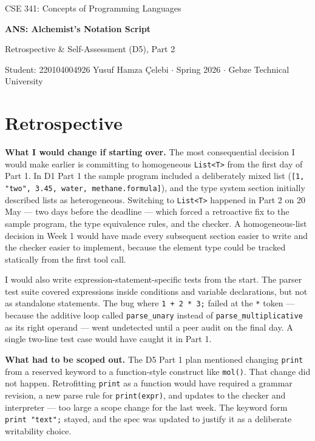 \documentclass[11pt,a4paper]{article}
\newcommand{\code}[1]{\texttt{#1}}
\begin{document}
\begin{center}
  {\footnotesize\color{anscaption}CSE 341: Concepts of Programming Languages\par}
  \vspace{3pt}
  {\huge\bfseries\sffamily ANS: Alchemist's Notation Script\par}
  \vspace{4pt}
  {\large Retrospective \& Self-Assessment (D5), Part 2\par}
  \vspace{6pt}
  {\footnotesize\color{anscaption}
    Student: 220104004926 Yusuf Hamza \c{C}elebi \(\cdot\)
    Spring 2026 \(\cdot\)
    Gebze Technical University\par}
\end{center}
\vspace{7pt}

\section{Retrospective}

\textbf{What I would change if starting over.}\;
The most consequential decision I would make earlier is committing to homogeneous \code{List<T>} from the first day of Part 1. In D1 Part 1 the sample program included a deliberately mixed list (\code{[1, "two", 3.45, water, methane.formula]}), and the type system section initially described lists as heterogeneous. Switching to \code{List<T>} happened in Part 2 on 20 May --- two days before the deadline --- which forced a retroactive fix to the sample program, the type equivalence rules, and the checker. A homogeneous-list decision in Week 1 would have made every subsequent section easier to write and the checker easier to implement, because the element type could be tracked statically from the first tool call.

I would also write expression-statement-specific tests from the start. The parser test suite covered expressions inside conditions and variable declarations, but not as standalone statements. The bug where \code{1 + 2 * 3;} failed at the \code{*} token --- because the additive loop called \code{parse\_unary} instead of \code{parse\_multiplicative} as its right operand --- went undetected until a peer audit on the final day. A single two-line test case would have caught it in Part 1.

\textbf{What had to be scoped out.}\;
The D5 Part 1 plan mentioned changing \code{print} from a reserved keyword to a function-style construct like \code{mol()}. That change did not happen. Retrofitting \code{print} as a function would have required a grammar revision, a new parse rule for \code{print(expr)}, and updates to the checker and interpreter --- too large a scope change for the last week. The keyword form \code{print "text";} stayed, and the spec was updated to justify it as a deliberate writability choice.
\end{document}
